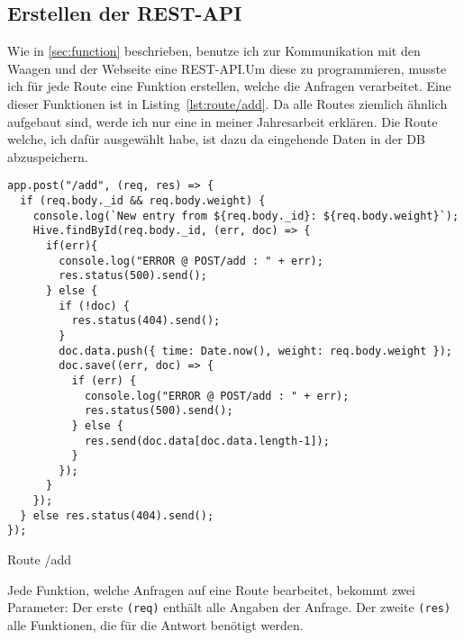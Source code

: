 \documentclass[a4paper, ngerman, 11pt]{scrartcl}
\newcommand{\js}[1]{\texttt{#1}}
\begin{document}
\subsection{Erstellen der REST-API} %

Wie in \autoref{sec:function} beschrieben, benutze ich zur Kommunikation mit den Waagen und der Webseite eine REST-API.\@ Um diese zu programmieren, musste ich für jede Route eine Funktion erstellen, welche die Anfragen verarbeitet. Eine dieser Funktionen ist in Listing~\ref{lst:route/add}. Da alle Routes ziemlich ähnlich aufgebaut sind, werde ich nur eine in meiner Jahresarbeit erklären. Die Route welche, ich dafür ausgewählt habe, ist dazu da eingehende Daten in der DB abzuspeichern. 
\begin{listing}[ht]
\begin{verbatim}
app.post("/add", (req, res) => {
  if (req.body._id && req.body.weight) {
    console.log(`New entry from ${req.body._id}: ${req.body.weight}`);
    Hive.findById(req.body._id, (err, doc) => {
      if(err){
        console.log("ERROR @ POST/add : " + err);
        res.status(500).send();
      } else {
        if (!doc) {
          res.status(404).send();
        }
        doc.data.push({ time: Date.now(), weight: req.body.weight });
        doc.save((err, doc) => {
          if (err) {
            console.log("ERROR @ POST/add : " + err);
            res.status(500).send();
          } else {
            res.send(doc.data[doc.data.length-1]);
          }
        });
      }
    });
  } else res.status(404).send();
});
\end{verbatim}
\caption{Route /add}\label{lst:route/add}
\end{listing}

Jede Funktion, welche Anfragen auf eine Route bearbeitet, bekommt zwei Parameter: Der erste \js{(req)} enthält alle Angaben der Anfrage. Der zweite \js{(res)} alle Funktionen, die für die Antwort benötigt werden.
\end{document}
